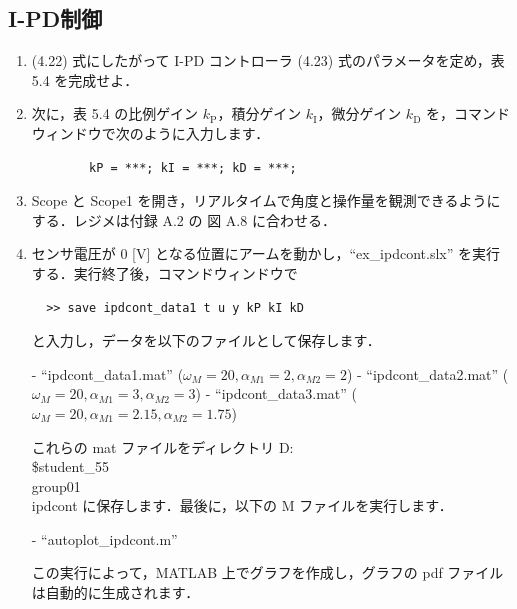 \subsection{I-PD制御}

\begin{enumerate}
  \item (4.22) 式にしたがって I-PD コントローラ (4.23) 式のパラメータを定め，表 5.4 を完成せよ．
        
  \item 次に，表 5.4 の比例ゲイン $k_{\mathrm{P}}$，積分ゲイン $k_{\mathrm{I}}$，微分ゲイン $k_{\mathrm{D}}$ を，コマンドウィンドウで次のように入力します．
        \begin{verbatim}
        kP = ***; kI = ***; kD = ***;
        \end{verbatim}
        
  \item Scope と Scope1 を開き，リアルタイムで角度と操作量を観測できるようにする．レジメは付録 A.2 の 図 A.8 に合わせる．
        
  \item センサ電圧が 0 [V] となる位置にアームを動かし，“ex\_ipdcont.slx” を実行する．実行終了後，コマンドウィンドウで
        \begin{verbatim}
  >> save ipdcont_data1 t u y kP kI kD
  \end{verbatim}
        と入力し，データを以下のファイルとして保存します．
        
        - “ipdcont\_data1.mat” ($\omega_M = 20, \alpha_{M1} = 2, \alpha_{M2} = 2$)
        - “ipdcont\_data2.mat” ($\omega_M = 20, \alpha_{M1} = 3, \alpha_{M2} = 3$)
        - “ipdcont\_data3.mat” ($\omega_M = 20, \alpha_{M1} = 2.15, \alpha_{M2} = 1.75$)
        
        これらの mat ファイルをディレクトリ D:\\\$student\_55\\group01\\ipdcont に保存します．最後に，以下の M ファイルを実行します．
        
        - “autoplot\_ipdcont.m”
        
        この実行によって，MATLAB 上でグラフを作成し，グラフの pdf ファイルは自動的に生成されます．
\end{enumerate}

